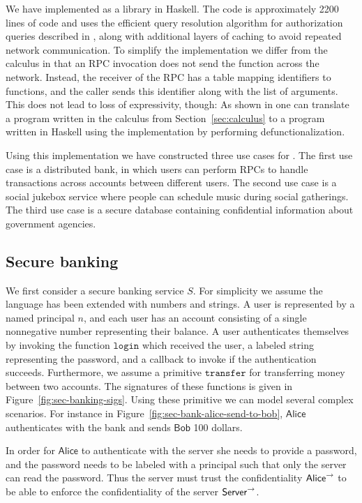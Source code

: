 We have implemented \lang{} as a library in Haskell. The code is approximately 2200 lines of code and uses the efficient query resolution algorithm for authorization queries described in \cite{Arden:2015:FA:2859845.2859998}, along with additional layers of caching to avoid repeated network communication. To simplify the implementation we differ from the calculus in that an RPC invocation does not send the function across the network. Instead, the receiver of the RPC has a table mapping identifiers to functions, and the caller sends this identifier along with the list of arguments. This does not lead to loss of expressivity, though: As shown in \cite{Cooper:2009:RC:1599410.1599439} one can translate a program written in the calculus from Section~\ref{sec:calculus} to a program written in Haskell using the \lang{} implementation by performing defunctionalization.

Using this implementation we have constructed three use cases for \lang. The first use case is a distributed bank, in which users can perform RPCs to handle transactions across accounts between different users. The second use case is a social jukebox service \cite{Sprague:2008:MSU:1385569.1385652} where people can schedule music during social gatherings. The third use case is a secure database containing confidential information about government agencies.

\subsection{Secure banking}
We first consider a secure banking service $S$. For simplicity we assume the language has been extended with numbers and strings. A user is represented by a named principal $n$, and each user has an account consisting of a single nonnegative number representing their balance. A user authenticates themselves by invoking the function $\mathtt{login}$ which received the user, a labeled string representing the password, and a callback to invoke if the authentication succeeds. Furthermore, we assume a primitive $\mathtt{transfer}$ for transferring money between two accounts. The signatures of these functions is given in Figure~\ref{fig:sec-banking-sigs}.
Using these primitive we can model several complex scenarios. For instance in Figure~\ref{fig:sec-bank-alice-send-to-bob}, $\mathsf{Alice}$ authenticates with the bank and sends $\mathsf{Bob}$ 100 dollars.

In order for $\mathsf{Alice}$ to authenticate with the server she needs to provide a password, and the password needs to be labeled with a principal such that only the server can read the password. Thus the server must trust the confidentiality $\mathsf{Alice}^{\rightarrow}$ to be able to enforce the confidentiality of the server $\mathsf{Server}^{\rightarrow}$. 

